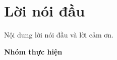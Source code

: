 \section*{Lời nói đầu}
Nội dung lời nói đầu và lời cảm ơn.

\medskip
\begin{flushright}
  \textbf{Nhóm thực hiện}
\end{flushright}
